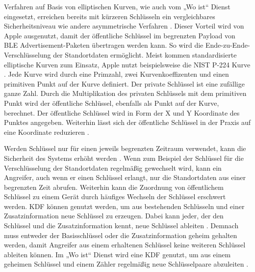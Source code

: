 Verfahren auf Basis von elliptischen Kurven, wie auch vom „Wo ist“ Dienst eingesetzt, erreichen bereits mit kürzeren Schlüsseln ein vergleichbares Sicherheitsniveau wie andere asymmetrische Verfahren \cite[S. 273.]{Krypto}.
Dieser Vorteil wird von Apple ausgenutzt, damit der öffentliche Schlüssel im begrenzten Payload von \ac{BLE} Advertisement-Paketen übertragen werden kann.
So wird die Ende-zu-Ende-Verschlüsselung der Standortdaten ermöglicht.
Meist kommen standardisierte elliptische Kurven zum Einsatz, Apple nutzt beispielsweise die NIST P-224 Kurve \cite{Heinrich_FindMy}.
Jede Kurve wird durch eine Primzahl, zwei Kurvenkoeffizenten und einen primitiven Punkt auf der Kurve definiert.
Der private Schlüssel ist eine zufällige ganze Zahl.
Durch die Multiplikation des privaten Schlüssels mit dem primitiven Punkt wird der öffentliche Schlüssel, ebenfalls als Punkt auf der Kurve, berechnet.
Der öffentliche Schlüssel wird in Form der X und Y Koordinate des Punktes angegeben.
Weiterhin lässt sich der öffentliche Schlüssel in der Praxis auf eine Koordinate reduzieren \cite[S. 284f.]{Krypto}.

Werden Schlüssel nur für einen jeweils begrenzten Zeitraum verwendet, kann die Sicherheit des Systems erhöht werden \cite[S. 378f.]{Krypto}.
Wenn zum Beispiel der Schlüssel für die Verschlüsselung der Standortdaten regelmäßig gewechselt wird, kann ein Angreifer, auch wenn er einen Schlüssel erlangt, nur die Standortdaten aus einer begrenzten Zeit abrufen.
Weiterhin kann die Zuordnung von öffentlichem Schlüssel zu einem Gerät durch häufiges Wechseln der Schlüssel erschwert werden.
\ac{KDF} können genutzt werden, um aus bestehenden Schlüsseln und einer Zusatzinformation neue Schlüssel zu erzeugen.
Dabei kann jeder, der den Schlüssel und die Zusatzinformation kennt, neue Schlüssel ableiten \cite[S. 378ff.]{Krypto}.
Demnach muss entweder der Basisschlüssel oder die Zusatzinformation geheim gehalten werden, damit Angreifer aus einem erhaltenen Schlüssel keine weiteren Schlüssel ableiten können.
Im „Wo ist“ Dienst wird eine \ac{KDF} genutzt, um aus einem geheimen Schlüssel und einem Zähler regelmäßig neue Schlüsselpaare abzuleiten \cite{Heinrich_FindMy}.
